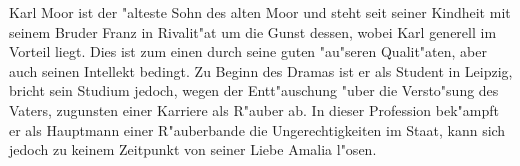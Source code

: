 Karl Moor ist der "alteste Sohn des alten Moor und steht seit seiner Kindheit mit seinem Bruder Franz in Rivalit"at um die Gunst dessen, wobei Karl generell im Vorteil liegt. Dies ist zum einen durch seine guten "au"seren Qualit"aten, aber auch seinen Intellekt bedingt.
Zu Beginn des Dramas ist er als Student in Leipzig, bricht sein Studium jedoch, wegen der Entt"auschung "uber die Versto"sung des Vaters, zugunsten einer Karriere als R"auber ab. In dieser Profession bek"ampft er als Hauptmann einer R"auberbande die Ungerechtigkeiten im Staat, kann sich jedoch zu keinem Zeitpunkt von seiner Liebe Amalia l"osen.
